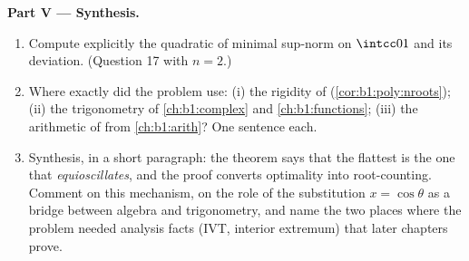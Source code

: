 \begin{problem}
\medskip
\noindent\textbf{Part V --- Synthesis.}
\begin{enumerate}[resume]
  \item Compute explicitly the  quadratic of minimal
        sup-norm on $\intcc01$ and its deviation. (Question 17
        with $n = 2$.)
  \item Where exactly did the problem use: (i) the rigidity of
         (\cref{cor:b1:poly:nroots}); (ii) the
        trigonometry of \cref{ch:b1:complex} and
        \cref{ch:b1:functions}; (iii) the arithmetic of  from \cref{ch:b1:arith}? One sentence each.
  \item Synthesis, in a short paragraph: the theorem says that
        the flattest  is the one that
        \emph{equioscillates}, and the proof converts optimality
        into root-counting. Comment on this mechanism, on the
        role of the substitution $x = \cos\theta$ as a bridge
        between algebra and trigonometry, and name the two
        places where the problem needed analysis facts (IVT,
        interior extremum) that later chapters prove.
\end{enumerate}
\end{problem}
